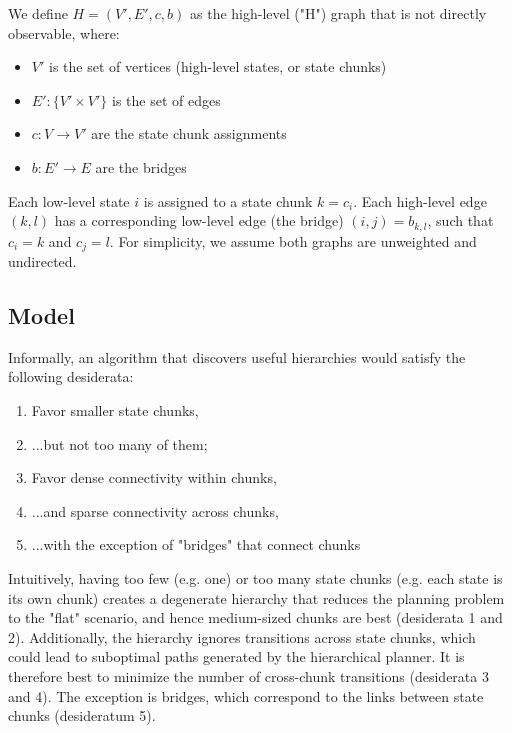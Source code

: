 \documentclass[11pt]{article}
\begin{document}
We define $H = (V', E', c, b)$ as the high-level ("H") graph that is not directly observable, where:

\begin{itemize}
    \item $V'$ is the set of vertices (high-level states, or state chunks)
    \item $E': \{V' \times V'\}$ is the set of edges
    \item $c: V \rightarrow V'$ are the state chunk assignments
    \item $b: E' \rightarrow E$ are the bridges
\end{itemize}

Each low-level state $i$ is assigned to a state chunk $k = c_i$. Each high-level edge $(k,l)$ has a corresponding low-level edge (the bridge) $(i,j) = b_{k,l}$, such that $c_i = k$ and $c_j = l$. For simplicity, we assume both graphs are unweighted and undirected.

\subsection{Model}

Informally, an algorithm that discovers useful hierarchies would satisfy the following desiderata:

\begin{enumerate}
    \item Favor smaller state chunks,
    \item ...but not too many of them;
    \item Favor dense connectivity within chunks, %
    \item ...and sparse connectivity across chunks, 
    \item ...with the exception of "bridges" that connect chunks
\end{enumerate}

Intuitively, having too few (e.g. one) or too many state chunks (e.g. each state is its own chunk) creates a degenerate hierarchy that reduces the planning problem to the "flat" scenario, and hence medium-sized chunks are best (desiderata 1 and 2). Additionally, the hierarchy ignores transitions across state chunks, which could lead to suboptimal paths generated by the hierarchical planner. It is therefore best to minimize the number of cross-chunk transitions (desiderata 3 and 4). The exception is bridges, which correspond to the links between state chunks (desideratum 5). 
\end{document}
